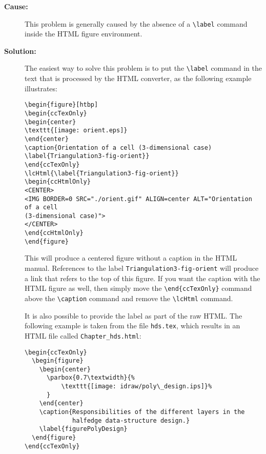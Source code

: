 \begin{description}
\item[{\bf Cause:}] This problem is generally caused by the absence of a
     \verb|\label| command inside the HTML figure environment.

\item[{\bf Solution:}]  
The easiest way to solve this problem is to put the 
\verb|\label| command in the text that is processed by the HTML converter,
as the following example illustrates:

\begin{verbatim}
\begin{figure}[htbp]
\begin{ccTexOnly}
\begin{center}
\texttt{[image: orient.eps]}
\end{center}
\caption{Orientation of a cell (3-dimensional case)
\label{Triangulation3-fig-orient}}
\end{ccTexOnly}
\lcHtml{\label{Triangulation3-fig-orient}}
\begin{ccHtmlOnly}
<CENTER>
<IMG BORDER=0 SRC="./orient.gif" ALIGN=center ALT="Orientation of a cell
(3-dimensional case)">
</CENTER>
\end{ccHtmlOnly}
\end{figure}
\end{verbatim}

This will produce a centered figure without a caption in the HTML manual.
References to the label {\tt Triangulation3-fig-orient} will produce a
link that refers to the top of this figure.  If you want the caption with
the HTML figure as well, then simply move the \verb|\end{ccTexOnly}|
command above the \verb|\caption| command and remove the \verb|\lcHtml|
command.

It is also possible to provide the label as part of the raw
HTML.  The following example is taken from the file {\tt hds.tex}, which
results in an HTML file called {\tt Chapter\_hds.html}:

\begin{verbatim}
\begin{ccTexOnly}
  \begin{figure}
    \begin{center}
      \parbox{0.7\textwidth}{%
          \texttt{[image: idraw/poly\_design.ips]}%
      }
    \end{center}
    \caption{Responsibilities of the different layers in the
             halfedge data-structure design.}
    \label{figurePolyDesign}
  \end{figure}
\end{ccTexOnly}


\end{verbatim}
\end{description}
